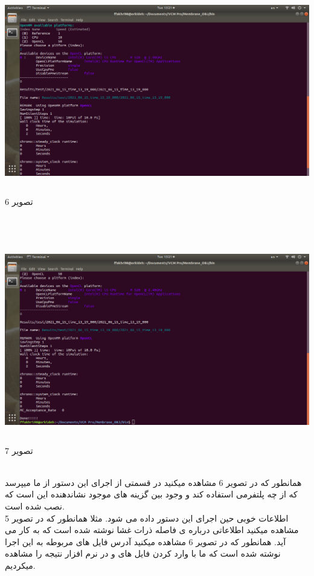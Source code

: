 \documentclass[12pt,onecolumn,a4paper]{report}
\begin{document}
{\begin{center}
\includegraphics[width=16cm, height=9cm]{06.png}\\
\caption{تصویر 6}
\end{center}\\
\begin{center}
\includegraphics[width=16cm, height=9cm]{07.png}\\
\caption{تصویر 7}
\end{center}\\
همانطور که در تصویر 6 مشاهده میکنید در قسمتی از اجرای این دستور از ما میپرسد که از چه پلتفرمی استفاده کند و وجود  بین گزینه های موجود نشاندهنده این است که نصب شده است.\\
اطلاعات خوبی حین اجرای این دستور داده می شود. مثلا همانطور که در تصویر 5 مشاهده میکنید اطلاعاتی درباره ی فاصله ذرات غشا نوشته شده است که به کار می آید.
همانطور که در تصویر 6 مشاهده میکنید آدرس فایل های مربوطه به این اجرا نوشته شده است که ما با وارد کردن فایل های  و 
در نرم افزار  نتیجه را مشاهده میکردیم.
}
\end{document}
